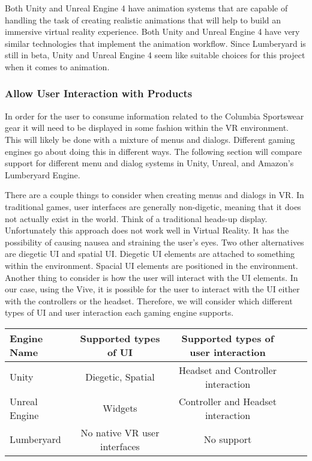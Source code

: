 \documentclass[10pt,journal,compsoc,onecolumn, draftclsnofoot]{IEEEtran}
\begin{document}
Both Unity and Unreal Engine 4 have animation systems that are capable of handling the task of creating realistic animations that will help to build an immersive virtual reality experience. Both Unity and Unreal Engine 4 have very similar technologies that implement the animation workflow. Since Lumberyard is still in beta, Unity and Unreal Engine 4 seem like suitable choices for this project when it comes to animation.

\subsubsection{Allow User Interaction with Products}
In order for the user to consume information related to the Columbia Sportswear gear it will need to be displayed in some fashion within the VR environment.
This will likely be done with a mixture of menus and dialogs.
Different gaming engines go about doing this in different ways.
The following section will compare support for different menu and dialog systems in Unity, Unreal, and Amazon's Lumberyard Engine.

There are a couple things to consider when creating menus and dialogs in VR.
In traditional games, user interfaces are generally non-digetic, meaning that it does not actually exist in the world.
Think of a traditional heads-up display.
Unfortunately this approach does not work well in Virtual Reality.
It has the possibility of causing nausea and straining the user's eyes.
Two other alternatives are diegetic UI and spatial UI.
Diegetic UI elements are attached to something within the environment.
Spacial UI elements are positioned in the environment.
Another thing to consider is how the user will interact with the UI elements.
In our case, using the Vive, it is possible for the user to interact with the UI either with the controllers or the headset.
Therefore, we will consider which different types of UI and user interaction each gaming engine supports.

\vspace{2mm}
\begin{table}[h!]
\centering
  \begin{tabular}{ | l || c | c | c | c |  }
  \hline
  Engine Name & Supported types of UI & Supported types of user interaction \\
  \hline
  Unity & Diegetic, Spatial &  Headset and Controller interaction\\ \hline
  Unreal Engine & Widgets & Controller and Headset interaction\\ \hline
  Lumberyard & No native VR user interfaces & No support\\ \hline
  \end{tabular}
\end{table}
\vspace{2mm}
\end{document}
